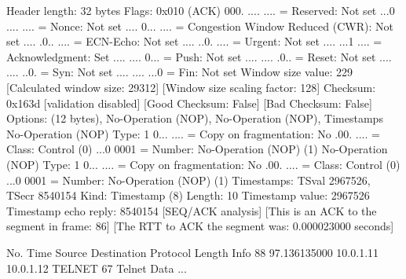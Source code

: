     Header length: 32 bytes
    Flags: 0x010 (ACK)
        000. .... .... = Reserved: Not set
        ...0 .... .... = Nonce: Not set
        .... 0... .... = Congestion Window Reduced (CWR): Not set
        .... .0.. .... = ECN-Echo: Not set
        .... ..0. .... = Urgent: Not set
        .... ...1 .... = Acknowledgment: Set
        .... .... 0... = Push: Not set
        .... .... .0.. = Reset: Not set
        .... .... ..0. = Syn: Not set
        .... .... ...0 = Fin: Not set
    Window size value: 229
    [Calculated window size: 29312]
    [Window size scaling factor: 128]
    Checksum: 0x163d [validation disabled]
        [Good Checksum: False]
        [Bad Checksum: False]
    Options: (12 bytes), No-Operation (NOP), No-Operation (NOP), Timestamps
        No-Operation (NOP)
            Type: 1
                0... .... = Copy on fragmentation: No
                .00. .... = Class: Control (0)
                ...0 0001 = Number: No-Operation (NOP) (1)
        No-Operation (NOP)
            Type: 1
                0... .... = Copy on fragmentation: No
                .00. .... = Class: Control (0)
                ...0 0001 = Number: No-Operation (NOP) (1)
        Timestamps: TSval 2967526, TSecr 8540154
            Kind: Timestamp (8)
            Length: 10
            Timestamp value: 2967526
            Timestamp echo reply: 8540154
    [SEQ/ACK analysis]
        [This is an ACK to the segment in frame: 86]
        [The RTT to ACK the segment was: 0.000023000 seconds]

No.     Time           Source                Destination           Protocol Length Info
     88 97.136135000   10.0.1.11             10.0.1.12             TELNET   67     Telnet Data ...

